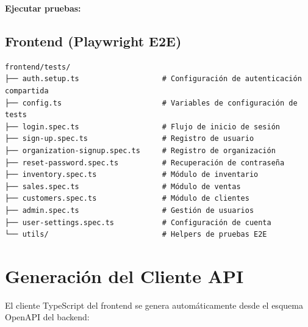 \textbf{Ejecutar pruebas:}

\begin{Shaded}
\begin{Highlighting}[]
    
       
\end{Highlighting}
\end{Shaded}

\subsection{Frontend (Playwright E2E)}\label{frontend-playwright-e2e}

\begin{verbatim}
frontend/tests/
├── auth.setup.ts                   # Configuración de autenticación compartida
├── config.ts                       # Variables de configuración de tests
├── login.spec.ts                   # Flujo de inicio de sesión
├── sign-up.spec.ts                 # Registro de usuario
├── organization-signup.spec.ts     # Registro de organización
├── reset-password.spec.ts          # Recuperación de contraseña
├── inventory.spec.ts               # Módulo de inventario
├── sales.spec.ts                   # Módulo de ventas
├── customers.spec.ts               # Módulo de clientes
├── admin.spec.ts                   # Gestión de usuarios
├── user-settings.spec.ts           # Configuración de cuenta
└── utils/                          # Helpers de pruebas E2E
\end{verbatim}

\section{Generación del Cliente API}\label{generaciuxf3n-del-cliente-api}

El cliente TypeScript del frontend se genera automáticamente desde el esquema OpenAPI del backend:

\begin{Shaded}
\begin{Highlighting}[]
\end{Highlighting}
\end{Shaded}

